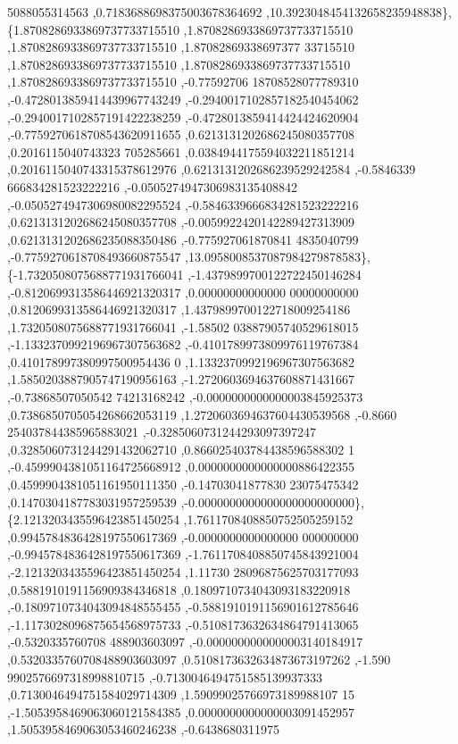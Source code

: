 \begin{DoxyCode}
      5088055314563 ,0.7183688698375003678364692 ,10.3923048454132658235948838\},
\{1.8708286933869737733715510 ,1.8708286933869737733715510 ,1.8708286933869737733715510 ,1.87082869338697377
      33715510 ,1.8708286933869737733715510 ,1.8708286933869737733715510 ,1.8708286933869737733715510 ,-0.77592706
      18708528077789310 ,-0.4728013859414439967743249 ,-0.2940017102857182540454062 ,-0.2940017102857191422238259 
      ,-0.4728013859414424424620904 ,-0.7759270618708543620911655 ,0.6213131202686245080357708 ,0.2016115040743323
      705285661 ,0.0384944175594032211851214 ,0.2016115040743315378612976 ,0.6213131202686239529242584 ,-0.5846339
      666834281523222216 ,-0.0505274947306983135408842 ,-0.0505274947306980082295524 ,-0.5846339666834281523222216
       ,0.6213131202686245080357708 ,-0.0059922420142289427313909 ,0.6213131202686235088350486 ,-0.775927061870841
      4835040799 ,-0.7759270618708493660875547 ,13.0958008537087984279878583\},
\{-1.7320508075688771931766041 ,-1.4379899700122722450146284 ,-0.8120699313586446921320317 ,0.00000000000000
      00000000000 ,0.8120699313586446921320317 ,1.4379899700122718009254186 ,1.7320508075688771931766041 ,-1.58502
      03887905740529618015 ,-1.1332370992196967307563682 ,-0.4101789973809976119767384 ,0.410178997380997500954436
      0 ,1.1332370992196967307563682 ,1.5850203887905747190956163 ,-1.2720603694637608871431667 ,-0.73868507050542
      74213168242 ,-0.0000000000000003845925373 ,0.7386850705054268662053119 ,1.2720603694637604430539568 ,-0.8660
      254037844385965883021 ,-0.3285060731244293097397247 ,0.3285060731244291432062710 ,0.866025403784438596588302
      1 ,-0.4599904381051164725668912 ,0.0000000000000000886422355 ,0.4599904381051161950111350 ,-0.14703041877830
      23075475342 ,0.1470304187783031957259539 ,-0.0000000000000000000000000\},
\{2.1213203435596423851450254 ,1.7611708408850752505259152 ,0.9945784836428197550617369 ,-0.0000000000000000
      000000000 ,-0.9945784836428197550617369 ,-1.7611708408850745843921004 ,-2.1213203435596423851450254 ,1.11730
      28096875625703177093 ,0.5881910191156909384346818 ,0.1809710734043093183220918 ,-0.1809710734043094848555455
       ,-0.5881910191156901612785646 ,-1.1173028096875654568975733 ,-0.5108173632634864791413065 ,-0.5320335760708
      488903603097 ,-0.0000000000000003140184917 ,0.5320335760708488903603097 ,0.5108173632634873673197262 ,-1.590
      9902576697318998810715 ,-0.7130046494751585139937333 ,0.7130046494751584029714309 ,1.59099025766973189988107
      15 ,-1.5053958469063060121584385 ,0.0000000000000003091452957 ,1.5053958469063053460246238 ,-0.6438680311975

\end{DoxyCode}
